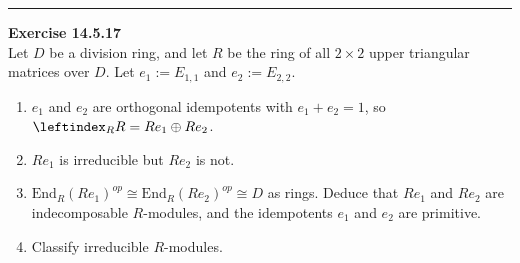 \documentclass[a4paper, 12pt]{article}
\newenvironment{problem}[2][Exercise]
    { \begin{mdframed}[backgroundcolor=gray!20] \textbf{#1 #2} \\}
    {  \end{mdframed}}
\begin{document}
\noindent\rule{7in}{2.8pt}
\newpage 
\begin{problem}{14.5.17}
Let \(D\) be a division ring, and let \(R\) be the ring of all \(2\times 2\) upper triangular matrices over \(D\). Let \(e_1:=E_{1,1}\) and \(e_2:=E_{2,2}\).
\begin{enumerate}[(1)]
\item \(e_1\) and \(e_2\) are orthogonal idempotents with \(e_1+e_2=1\), so \(\leftindex_R R=Re_1\oplus Re_2\).
\item \(Re_1\) is irreducible but \(Re_2\) is not.
\item \(\text{End}_R(Re_1)^{op}\cong \text{End}_R(Re_2)^{op}\cong D\) as rings. Deduce that \(Re_1\) and \(Re_2\) are indecomposable \(R\)-modules, and the idempotents \(e_1\) and \(e_2\) are primitive.
\item Classify irreducible \(R\)-modules.
\end{enumerate}
\end{problem}
\end{document}
